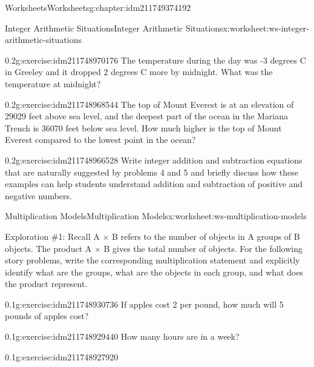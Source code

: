 \documentclass[twoside,11pt,]{book}
\begin{document}
\begin{chapterptx}{Worksheets}{}{Worksheets}{}{}{g:chapter:idm211749374192}
\begin{worksheet-section-numberless}{Integer Arithmetic Situations}{}{Integer Arithmetic Situations}{}{}{x:worksheet:ws-integer-arithmetic-situations}
\begin{divisionexercise}{4}{}{0.2}{g:exercise:idm211748970176}%
The temperature during the day was -3 degrees C in Greeley and it dropped 2 degrees C more by midnight. What was the temperature at midnight?%
\end{divisionexercise}%
\begin{divisionexercise}{5}{}{0.2}{g:exercise:idm211748968544}%
The top of Mount Everest is at an elevation of 29029 feet above sea level, and the deepest part of the ocean in the Mariana Trench is 36070 feet below sea level.  How much higher is the top of Mount Everest compared to the lowest point in the ocean?%
\end{divisionexercise}%
\clearpage
\begin{divisionexercise}{6}{}{0.2}{g:exercise:idm211748966528}%
Write integer addition and subtraction equations that are naturally suggested by problems 4 and 5 and briefly discuss how these examples can help students understand addition and subtraction of positive and negative numbers.%
\end{divisionexercise}%
\end{worksheet-section-numberless}
\restoregeometry
%
%
\typeout{************************************************}
\typeout{************************************************}
%
\begin{worksheet-section-numberless}{Multiplication Models}{}{Multiplication Models}{}{}{x:worksheet:ws-multiplication-models}
\begin{introduction}{}%
Exploration \#1: Recall A \(\times \) B refers to the number of objects in A groups of B objects.  The product A \(\times \) B gives the total number of objects.  For the following story problems, write the corresponding multiplication statement and explicitly identify what are the groups, what are the objects in each group, and what does the product represent.%
\end{introduction}%
\begin{divisionexercise}{1}{}{0.1}{g:exercise:idm211748930736}%
If apples cost \textdollar{}2 per pound, how much will 5 pounds of apples cost?%
\end{divisionexercise}%
\begin{divisionexercise}{2}{}{0.1}{g:exercise:idm211748929440}%
How many hours are in a week?%
\end{divisionexercise}%
\begin{divisionexercise}{3}{}{0.1}{g:exercise:idm211748927920}%

\end{divisionexercise}
\end{worksheet-section-numberless}
\end{chapterptx}
\end{document}
